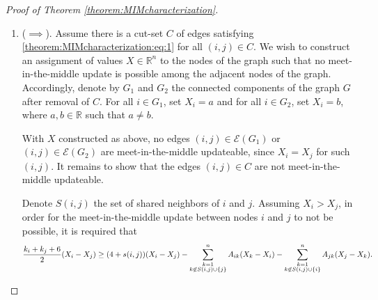 \documentclass{article}
\theoremstyle{remark}
\newtheorem{lemma}{Lemma}
\newcommand{\R}[0]{\mathbb{R}}
\begin{document}
%
%



\begin{proof}[Proof of Theorem \ref{theorem:MIMcharacterization}]
\begin{enumerate}
	\item ($\implies$). Assume there is a cut-set $C$ of edges satisfying \eqref{theorem:MIMcharacterization:eq:1} for all $(i,j)\in C$. We wish to construct an assignment of values $X\in\R^n$ to the nodes of the graph such that no meet-in-the-middle update is possible among the adjacent nodes of the graph. Accordingly, denote by $G_1$ and $G_2$ the connected components of the graph $G$ after removal of $C$. For all $i\in G_1$, set $X_i = a$ and for all $i\in G_2$, set $X_i = b$, where $a,b\in\R$ such that $a\neq b$.
	
		With $X$ constructed as above, no edges $(i,j)\in \mathcal{E}(G_1)$ or $(i,j)\in \mathcal{E}(G_2)$ are meet-in-the-middle updateable, since $X_i=X_j$ for such $(i,j)$.  It remains to show that the edges $(i,j)\in C$ are not meet-in-the-middle updateable.
	
		Denote $S(i,j)$ the set of shared neighbors of $i$ and $j$. Assuming $X_i>X_j$, in order for the meet-in-the-middle update between nodes $i$ and $j$ to not be possible, it is required that
		\begin{equation}{\label{theorem:MIMcharacterization:eq:12}}
			\frac{k_i+k_j+6}{2}(X_i-X_j) \geq (4+s(i,j))(X_i-X_j) - \sum_{\substack{k=1\\k\not\in S(i,j)\cup\{j\}}}^nA_{ik}(X_k-X_i) - \sum_{\substack{k=1\\k\not\in S(i,j)\cup\{i\}}}^nA_{jk}(X_j-X_k).
		\end{equation}
\end{enumerate}
\end{proof}
\end{document}
